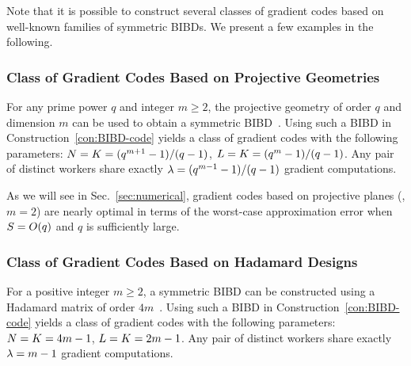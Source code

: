 \documentclass[conference,letterpaper]{IEEEtran}
\begin{document}
Note that it is possible to construct several classes of gradient codes based on well-known families of symmetric BIBDs. We present a few examples in the following.

\subsubsection{Class of Gradient Codes Based on Projective Geometries} For any prime power $q$ and integer $m\geq 2$, the projective geometry of order $q$ and dimension $m$ can be used to obtain a symmetric BIBD~\cite{Stinson:2003}. Using such a BIBD in Construction~\ref{con:BIBD-code} yields a class of gradient codes with the following parameters: $N = K = (q^{m+1} - 1)/(q-1)$, $L = K = (q^m - 1)/(q - 1)$. Any pair of distinct workers share exactly $\lambda = (q^{m-1} - 1)/(q - 1)$ gradient computations. 

As we will see in Sec.~\ref{sec:numerical}, gradient codes based on projective planes (\ie, $m = 2$) are nearly optimal in terms of the worst-case approximation error when $S = O(q)$ and $q$ is sufficiently large. 

\subsubsection{Class of Gradient Codes Based on Hadamard Designs} For a positive integer $m \geq 2$, a symmetric BIBD can be constructed using a Hadamard matrix of order $4m$~\cite{Stinson:2003}. Using such a BIBD in Construction~\ref{con:BIBD-code} yields a class of gradient codes with the following parameters: $N = K = 4m - 1$, $L = K = 2m - 1$. Any pair of distinct workers share exactly $\lambda = m - 1$ gradient computations. 
\end{document}
